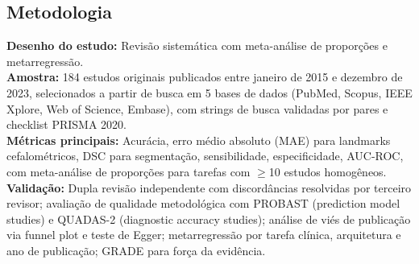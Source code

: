 \subsection{Metodologia}
\textbf{Desenho do estudo:} Revisão sistemática com meta-análise de
proporções e metarregressão. \\
\textbf{Amostra:} 184 estudos originais publicados entre janeiro de
2015 e dezembro de 2023, selecionados a partir de busca em 5 bases
de dados (PubMed, Scopus, IEEE Xplore, Web of Science, Embase),
com strings de busca validadas por pares e checklist PRISMA 2020. \\
\textbf{Métricas principais:} Acurácia, erro médio absoluto (MAE) para
landmarks cefalométricos, DSC para segmentação, sensibilidade,
especificidade, AUC-ROC, com meta-análise de proporções para tarefas
com $\geq$10 estudos homogêneos. \\
\textbf{Validação:} Dupla revisão independente com discordâncias
resolvidas por terceiro revisor; avaliação de qualidade metodológica
com PROBAST (prediction model studies) e QUADAS-2 (diagnostic accuracy
studies); análise de viés de publicação via funnel plot e teste de
Egger; metarregressão por tarefa clínica, arquitetura e ano de
publicação; GRADE para força da evidência.

